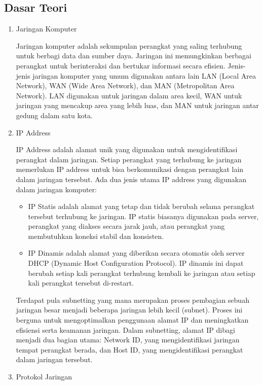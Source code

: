 \subsection{Dasar Teori}
\begin{enumerate}
	\item Jaringan Komputer 
	
	Jaringan komputer adalah sekumpulan perangkat yang saling terhubung untuk berbagi data dan sumber daya. Jaringan ini memungkinkan berbagai perangkat untuk berinteraksi dan bertukar informasi secara efisien. Jenis-jenis jaringan komputer yang umum digunakan antara lain LAN (Local Area Network), WAN (Wide Area Network), dan MAN (Metropolitan Area Network). LAN digunakan untuk jaringan dalam area kecil, WAN untuk jaringan yang mencakup area yang lebih luas, dan MAN untuk jaringan antar gedung dalam satu kota.
	\item IP Address
	
	IP Address adalah alamat unik yang digunakan untuk mengidentifikasi perangkat dalam jaringan. Setiap perangkat yang terhubung ke jaringan memerlukan IP address untuk bisa berkomunikasi dengan perangkat lain dalam jaringan tersebut. Ada dua jenis utama IP address yang digunakan dalam jaringan komputer:
	\begin{itemize}
		 \item IP Statis adalah alamat yang tetap dan tidak berubah selama perangkat tersebut terhubung ke jaringan. IP statis biasanya digunakan pada server, perangkat yang diakses secara jarak jauh, atau perangkat yang membutuhkan koneksi stabil dan konsisten.
		 \item IP Dinamis adalah alamat yang diberikan secara otomatis oleh server DHCP (Dynamic Host Configuration Protocol). IP dinamis ini dapat berubah setiap kali perangkat terhubung kembali ke jaringan atau setiap kali perangkat tersebut di-restart.
	\end{itemize}
Terdapat pula subnetting yang mana merupakan proses pembagian sebuah jaringan besar menjadi beberapa jaringan lebih kecil (subnet). Proses ini berguna untuk mengoptimalkan penggunaan alamat IP dan meningkatkan efisiensi serta keamanan jaringan. Dalam subnetting, alamat IP dibagi menjadi dua bagian utama: Network ID, yang mengidentifikasi jaringan tempat perangkat berada, dan Host ID, yang mengidentifikasi perangkat dalam jaringan tersebut.
	\item Protokol Jaringan 
	

\end{enumerate}
